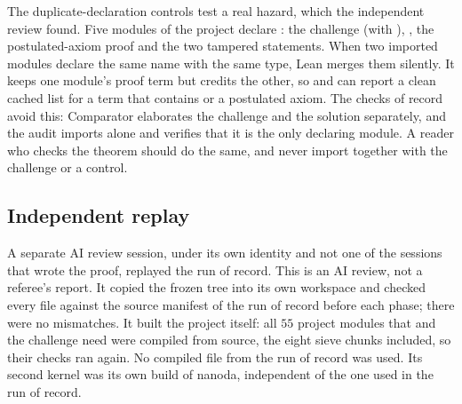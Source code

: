 \documentclass[11pt]{article}
\theoremstyle{definition}
\begin{document}
The duplicate-declaration controls test a real hazard, which the independent review found. Five modules of the project declare : the challenge (with ), , the postulated-axiom proof and the two tampered statements. When two imported modules declare the same name with the same type, Lean  merges them silently. It keeps one module's proof term but credits the other, so  and  can report a clean cached list for a term that contains  or a postulated axiom. The checks of record avoid this: Comparator elaborates the challenge and the solution separately, and the audit imports  alone and verifies that it is the only declaring module. A reader who checks the theorem should do the same, and never import  together with the challenge or a control.

\subsection{Independent replay}\label{sec:replay}

A separate AI review session, under its own identity and not one of the sessions that wrote the proof, replayed the run of record. This is an AI review, not a referee's report. It copied the frozen tree into its own workspace and checked every file against the source manifest of the run of record before each phase; there were no mismatches. It built the project itself: all $55$ project modules that  and the challenge need were compiled from source, the eight sieve chunks included, so their  checks ran again. No compiled file from the run of record was used. Its second kernel was its own build of nanoda, independent of the one used in the run of record.
\end{document}
